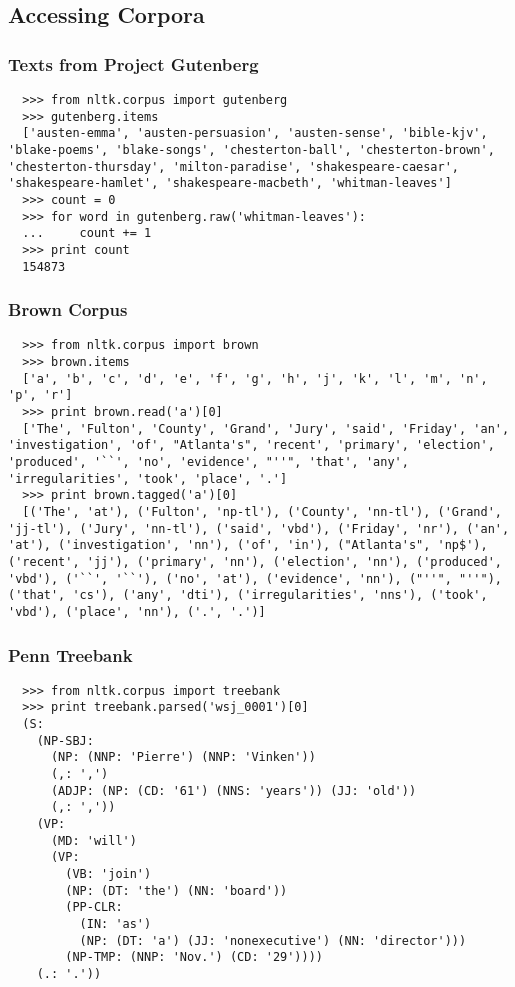 \documentclass{beamer}             %
\begin{document}
\subsection{Accessing Corpora}

\begin{frame}[fragile]
\frametitle{Texts from Project Gutenberg}

\begin{verbatim}
  >>> from nltk.corpus import gutenberg
  >>> gutenberg.items
  ['austen-emma', 'austen-persuasion', 'austen-sense', 'bible-kjv', 'blake-poems', 'blake-songs', 'chesterton-ball', 'chesterton-brown', 'chesterton-thursday', 'milton-paradise', 'shakespeare-caesar', 'shakespeare-hamlet', 'shakespeare-macbeth', 'whitman-leaves']
  >>> count = 0
  >>> for word in gutenberg.raw('whitman-leaves'):
  ...     count += 1
  >>> print count
  154873
\end{verbatim}
\end{frame}

\begin{frame}[fragile]
\frametitle{Brown Corpus}
\small

\begin{verbatim}
  >>> from nltk.corpus import brown
  >>> brown.items
  ['a', 'b', 'c', 'd', 'e', 'f', 'g', 'h', 'j', 'k', 'l', 'm', 'n', 'p', 'r']
  >>> print brown.read('a')[0]
  ['The', 'Fulton', 'County', 'Grand', 'Jury', 'said', 'Friday', 'an', 'investigation', 'of', "Atlanta's", 'recent', 'primary', 'election', 'produced', '``', 'no', 'evidence', "''", 'that', 'any', 'irregularities', 'took', 'place', '.']
  >>> print brown.tagged('a')[0]
  [('The', 'at'), ('Fulton', 'np-tl'), ('County', 'nn-tl'), ('Grand', 'jj-tl'), ('Jury', 'nn-tl'), ('said', 'vbd'), ('Friday', 'nr'), ('an', 'at'), ('investigation', 'nn'), ('of', 'in'), ("Atlanta's", 'np$'), ('recent', 'jj'), ('primary', 'nn'), ('election', 'nn'), ('produced', 'vbd'), ('``', '``'), ('no', 'at'), ('evidence', 'nn'), ("''", "''"), ('that', 'cs'), ('any', 'dti'), ('irregularities', 'nns'), ('took', 'vbd'), ('place', 'nn'), ('.', '.')]
\end{verbatim}
\end{frame}


\begin{frame}[fragile]
\frametitle{Penn Treebank}
\small

\begin{verbatim}
  >>> from nltk.corpus import treebank
  >>> print treebank.parsed('wsj_0001')[0]
  (S:
    (NP-SBJ:
      (NP: (NNP: 'Pierre') (NNP: 'Vinken'))
      (,: ',')
      (ADJP: (NP: (CD: '61') (NNS: 'years')) (JJ: 'old'))
      (,: ','))
    (VP:
      (MD: 'will')
      (VP:
        (VB: 'join')
        (NP: (DT: 'the') (NN: 'board'))
        (PP-CLR:
          (IN: 'as')
          (NP: (DT: 'a') (JJ: 'nonexecutive') (NN: 'director')))
        (NP-TMP: (NNP: 'Nov.') (CD: '29'))))
    (.: '.'))
\end{verbatim}
\end{frame}
\end{document}
